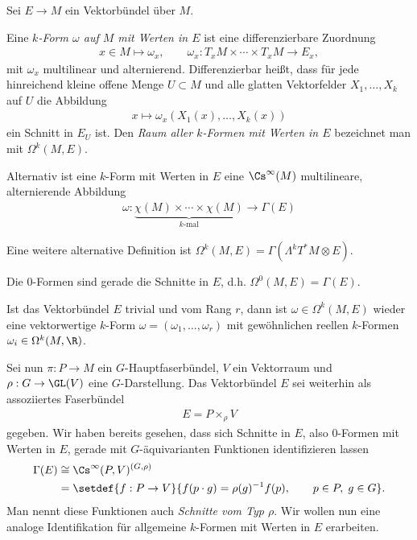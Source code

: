 \documentclass[%
	paper=a5,%
	fleqn,%
	DIV=18,%
	BCOR=0mm,
	fontsize=11pt,
	titlepage=false,%
	bibliography=totoc,
	DIV=18,%
	twoside=true,
	pdftitle=Riemannsche Geometrie,
	pdfauthor=Uwe Semmelmann,
	numbers=noendperiod]%
	{scrbook}
\begin{document}
Sei $E\to M$ ein Vektorbündel über $M$.

\begin{defn}
Eine \emph{$k$-Form $\omega$ auf $M$ mit Werten in $E$} ist eine
differenzierbare Zuordnung
\begin{align*}
x\in M\mapsto \omega_x,\qquad \omega_x : T_xM\times\cdots \times T_xM\to E_x,
\end{align*}
mit $\omega_x$ multilinear und alternierend. Differenzierbar heißt, dass für jede hinreichend kleine offene Menge
$U\subset M$ und alle glatten Vektorfelder $X_1,\ldots,X_k$ auf $U$ die
Abbildung
\begin{align*}
x\mapsto \omega_x(X_1(x),\ldots,X_k(x))
\end{align*}
ein Schnitt in $E_{U}$ ist. Den \emph{Raum aller $k$-Formen mit Werten in $E$}
bezeichnet man mit $\Omega^k(M,E)$.\fish
\end{defn}

\begin{rem}[Bemerkungen.]
\begin{remenum}
\item
Alternativ ist eine $k$-Form mit Werten in $E$ eine $\Cs^\infty(M)$
multilineare, alternierende Abbildung
\begin{align*}
\omega: \underbrace{\chi(M)\times \cdots \times \chi(M)}_{k\text{-mal}}\to
\Gamma(E)
\end{align*}
\item Eine weitere alternative Definition ist $\Omega^k(M,E)
=\Gamma(\Lambda^kT^*M\otimes E)$.
\item Die $0$-Formen sind gerade die Schnitte in $E$, d.h. $\Omega^0(M,E) =
\Gamma(E)$.
\item Ist das Vektorbündel $E$ trivial und vom Rang $r$, dann ist
$\omega\in\Omega^k(M,E)$ wieder eine vektorwertige $k$-Form $\omega =
(\omega_1,\ldots,\omega_r)$ mit gewöhnlichen reellen $k$-Formen
$\omega_i\in\Omega^k(M,\R)$.\map
\end{remenum}
\end{rem}

Sei nun $\pi: P\to M$ ein $G$-Hauptfaserbündel, $V$ ein Vektorraum und $\rho:
G\to \GL(V)$ eine $G$-Darstellung. Das Vektorbündel $E$ sei weiterhin als
assoziiertes Faserbündel
\begin{align*}
E = P\times_\rho V
\end{align*}
gegeben. Wir haben bereits gesehen, dass sich Schnitte in $E$, also $0$-Formen
mit Werten in $E$, gerade mit $G$-äquivarianten Funktionen identifizieren lassen
\begin{align*}
\Gamma(E) &\cong \Cs^\infty(P,V)^{(G,\rho)}\\
&= \setdef{f: P\to V}{f(p\cdot g) = \rho(g)^{-1}f(p),\qquad p\in P,\; g\in G}.
\end{align*}
Man nennt diese Funktionen auch \emph{Schnitte vom Typ $\rho$}.
Wir wollen nun eine analoge Identifikation für allgemeine $k$-Formen mit Werten
in $E$ erarbeiten.
\end{document}
